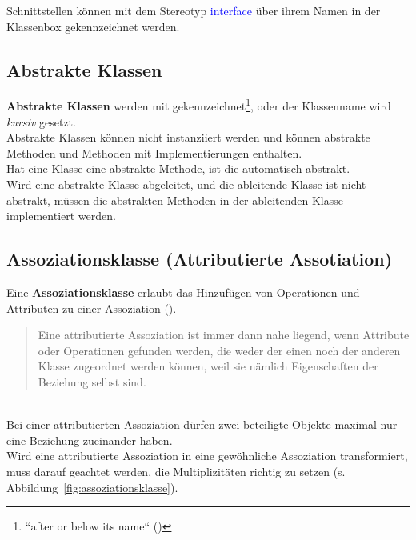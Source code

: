 \noindent
Schnittstellen können mit dem Stereotyp \textcolor{blue}{\guillemotleft interface\guillemotright} über ihrem Namen in der Klassenbox gekennzeichnet werden.

\subsection{Abstrakte Klassen}
\textbf{Abstrakte Klassen} werden mit  gekennzeichnet\footnote{
``after or below its name`` (\cite[101]{OMG17})
}, oder der Klassenname wird \textit{kursiv} gesetzt.\\
Abstrakte Klassen können nicht instanziiert werden und können abstrakte Methoden und Methoden mit Implementierungen enthalten.\\
Hat eine Klasse eine abstrakte Methode, ist die automatisch abstrakt.\\
Wird eine abstrakte Klasse abgeleitet, und die ableitende Klasse ist nicht abstrakt, müssen die abstrakten Methoden in der ableitenden Klasse implementiert werden.

\subsection{Assoziationsklasse (Attributierte Assotiation)}
Eine \textbf{Assoziationsklasse} erlaubt das Hinzufügen von Operationen und Attributen zu einer Assoziation (\cite[43]{Buh09}).

\blockquote[{\cite[277]{Oes05}}]{
Eine attributierte Assoziation ist immer dann nahe liegend, wenn Attribute oder Operationen gefunden werden, die weder der einen noch der anderen Klasse zugeordnet werden können, weil sie nämlich Eigenschaften der Beziehung selbst sind.
}.\\

\noindent
Bei einer attributierten Assoziation dürfen zwei beteiligte Objekte maximal nur eine Beziehung zueinander haben.\\

\noindent
Wird eine attributierte Assoziation in eine gewöhnliche Assoziation transformiert, muss darauf geachtet werden, die Multiplizitäten richtig zu setzen (s. Abbildung~\ref{fig:assoziationsklasse}).

